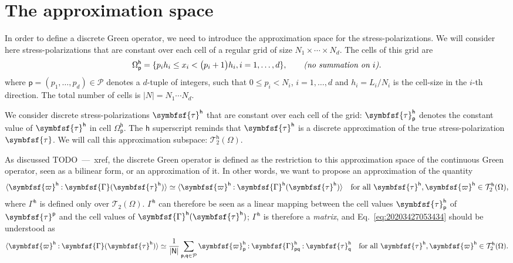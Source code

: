 \documentclass[draft, appendixprefix=true, chapterprefix=true, fontsize=12pt, numbers=noendperiod]{scrbook}
\newcommand{\cellindices}{\mathcal P}
\newcommand{\dbldot}{\mathbin{\mathord{:}}}
\newcommand{\tens}[1]{\symbfsf{#1}}
\newcommand{\tensors}{\mathcal T}
\newcommand{\todo}[1]{\color{red}TODO~---~#1\color{black}}
\newcommand{\tuple}[1]{\mathsf{#1}}
\begin{document}
\section{The approximation space}

In order to define a discrete Green operator, we need to introduce the
approximation space for the stress-polarizations. We will consider here
stress-polarizations that are constant over each cell of a regular grid of size
\(N_1\times\cdots\times N_d\). The cells of this grid are
\begin{equation}
  \Omega_{\tuple{p}}^{\tuple{h}}=\{p_ih_i\leq x_i<\bigl(p_i+1\bigr)h_i, i=1,
  \ldots, d\},
  \qquad\text{\emph{(no summation on \(i\)).}}
\end{equation}
where \(\tuple{p}=(p_1,\ldots,p_d)\in\cellindices\) denotes a \(d\)-tuple of
integers, such that \(0\leq p_i<N_i\), \(i=1,\ldots, d\) and \(h_i=L_i/N_i\) is
the cell-size in the \(i\)-th direction. The total number of cells is
\(\lvert N\rvert=N_1\cdots N_d\).

We consider discrete stress-polarizations \(\tens\tau^{\tuple{h}}\) that are
constant over each cell of the grid: \(\tens\tau_{\tuple{p}}^{\tuple{h}}\)
denotes the constant value of \(\tens\tau^{\tuple{h}}\) in cell
\(\Omega_{\tuple{p}}^{\tuple{h}}\). The \(\tuple{h}\) superscript reminds that
\(\tens\tau^{\tuple{h}}\) is a discrete approximation of the true
stress-polarization \(\tens\tau\). We will call this approximation subspace:
\(\tensors_2^{\tuple{h}}(\Omega)\).

As discussed \todo{xref}, the discrete Green operator is defined as the
restriction to this approximation space of the continuous Green operator, seen
as a bilinear form, or an approximation of it. In other words, we want to
propose an approximation of the quantity
\begin{equation}
  \label{eq:20203427053434}
  \langle\tens\varpi^{\tuple{h}}\dbldot\tens\Gamma(\tens\tau^{\tuple{h}})\rangle
  \simeq\langle\tens\varpi^{\tuple{h}}\dbldot\tens\Gamma^{\tuple{h}}(\tens
  \tau^{\tuple{h}})\rangle\quad\text{for all }\tens\tau^{\tuple{h}},
  \tens\varpi^{\tuple{h}}\in\tensors_2^{\tuple{h}}(\Omega),
\end{equation}
where \(\Gamma^{\tuple{h}}\) is defined only over
\(\tensors_2(\Omega)\). \(\Gamma^{\tuple{h}}\) can therefore be seen as a
linear mapping between the cell values \(\tens\tau_{\tuple{p}}^{\tuple{h}}\) of
\(\tens\tau^{\tuple{p}}\) and the cell values of
\(\tens\Gamma^{\tuple{h}}(\tens\tau^{\tuple{h}})\); \(\Gamma^{\tuple{h}}\) is
therefore a \emph{matrix}, and Eq.~\eqref{eq:20203427053434} should be
understood as
\begin{equation}
  \label{eq:20204027054030}
  \langle\tens\varpi^{\tuple{h}}\dbldot\tens\Gamma(\tens\tau^{\tuple{h}})\rangle
  \simeq\frac1{\lvert\tuple{N}\rvert}\sum_{\tuple{p}, \tuple{q}\in\cellindices}
  \tens\varpi_{\tuple{p}}^{\tuple{h}}\dbldot
  \tens\Gamma_{\tuple{p}\tuple{q}}^{\tuple{h}}\dbldot\tens
  \tau_{\tuple{q}}^{\tuple{h}}\quad\text{for all }\tens\tau^{\tuple{h}},
  \tens\varpi^{\tuple{h}}\in\tensors_2^{\tuple{h}}(\Omega).
\end{equation}
\end{document}

